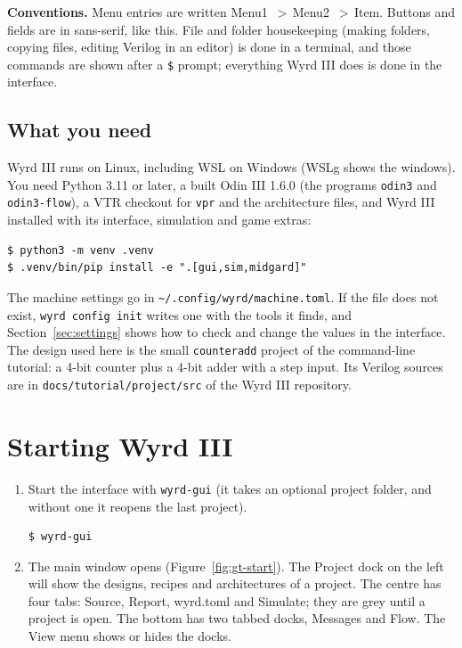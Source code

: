 \documentclass[11pt]{article}
\newcommand{\ui}[1]{\textsf{#1}}
\newcommand{\menu}[1]{\textsf{#1}}
\newcommand{\cmd}[1]{\texttt{#1}}
\newcommand{\gt}{\,$>$\,}
\begin{document}
\textbf{Conventions.} Menu entries are written \menu{Menu1 \gt Menu2 \gt Item}. Buttons and fields are in sans-serif,
\ui{like this}. File and folder housekeeping (making folders, copying files, editing Verilog in an editor) is done in a terminal,
and those commands are shown after a \cmd{\$} prompt; everything Wyrd III does is done in the interface.

\subsection{What you need}

Wyrd III runs on Linux, including WSL on Windows (WSLg shows the windows). You need Python 3.11 or later, a built
Odin III 1.6.0 (the programs \cmd{odin3} and \cmd{odin3-flow}), a VTR checkout for \cmd{vpr} and the architecture files, and Wyrd III
installed with its interface, simulation and game extras:
\begin{lstlisting}[language={}]
$ python3 -m venv .venv
$ .venv/bin/pip install -e ".[gui,sim,midgard]"
\end{lstlisting}
The machine settings go in \cmd{\textasciitilde/.config/wyrd/machine.toml}. If the file does not exist, \cmd{wyrd config init} writes
one with the tools it finds, and Section~\ref{sec:settings} shows how to check and change the values in the interface.
The design used here is the small \cmd{counteradd} project of the command-line tutorial: a 4-bit counter plus a 4-bit adder with a step
input. Its Verilog sources are in \cmd{docs/tutorial/project/src} of the Wyrd III repository.

\section{Starting Wyrd III}

\begin{enumerate}
\item Start the interface with \cmd{wyrd-gui} (it takes an optional project folder, and without one it reopens the last project).
\begin{lstlisting}[language={}]
$ wyrd-gui
\end{lstlisting}
\item The main window opens (Figure~\ref{fig:gt-start}). The \ui{Project} dock on the left will show the designs, recipes and architectures of
a project. The centre has four tabs: \ui{Source}, \ui{Report}, \ui{wyrd.toml} and \ui{Simulate}; they are grey until a project is open.
The bottom has two tabbed docks, \ui{Messages} and \ui{Flow}. The \menu{View} menu shows or hides the docks.
\end{enumerate}
\end{document}
